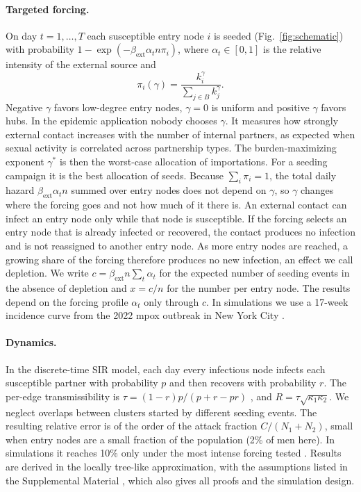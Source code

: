 \documentclass[pre,twocolumn,superscriptaddress,amsmath,amssymb,floatfix]{revtex4-2}
\begin{document}
\paragraph{Targeted forcing.} On day $t=1,\dots,T$ each susceptible entry node $i$ is
seeded (Fig.~\ref{fig:schematic}) with probability $1-\exp(-\beta_{\mathrm{ext}}\alpha_tn\pi_i)$, where $\alpha_t\in[0,1]$ is the
relative intensity of the external source and
\begin{equation}\label{eq:pi}
\pi_i(\gamma)=\frac{k_i^{\gamma}}{\sum_{j\in B}k_j^{\gamma}}.
\end{equation}
Negative $\gamma$ favors low-degree entry nodes, $\gamma=0$ is uniform and positive $\gamma$
favors hubs. In the epidemic application nobody chooses $\gamma$. It measures how
strongly external contact increases with the number of internal partners, as
expected when sexual activity is correlated across partnership types. The
burden-maximizing exponent $\gamma^*$ is then the worst-case allocation of
importations. For a seeding campaign it is the best allocation of seeds.
Because $\sum_i\pi_i=1$, the total daily hazard
$\beta_{\mathrm{ext}}\alpha_tn$ summed over entry nodes does not depend on $\gamma$, so $\gamma$ changes
where the forcing goes and not how much of it there is. An external contact can
infect an entry node only while that node is susceptible. If the forcing
selects an entry node that is already infected or recovered, the contact
produces no infection and is not reassigned to another entry node. As more
entry nodes are reached, a growing share of the forcing therefore produces no
new infection, an effect we call depletion. We write $c=\beta_{\mathrm{ext}}n\sum_t\alpha_t$ for the
expected number of seeding events in the absence of depletion and $x=c/n$ for
the number per entry node. The results depend on the forcing profile $\alpha_t$ only
through $c$. In simulations we use a 17-week incidence curve from the 2022 mpox
outbreak in New York City \cite{nycdohmh2022mpox}.

\paragraph{Dynamics.} In the discrete-time SIR model, each day every infectious node infects
each susceptible partner with probability $p$ and then recovers with
probability $r$. The per-edge transmissibility is
$\tau=(1-r)p/(p+r-pr)$ \cite{SM}, and $R=\tau\sqrt{\kappa_1\kappa_2}$.
We neglect overlaps between clusters started by different seeding events.
The resulting relative error is of the order of the attack fraction $C/(N_1+N_2)$,
small when entry nodes are a small fraction of the population (2\% of men
here). In simulations it reaches 10\% only under the most intense forcing tested
\cite{SM}. Results are derived in the locally tree-like approximation, with the
assumptions listed in the Supplemental Material \cite{SM}, which also gives all
proofs and the simulation design.
\end{document}
